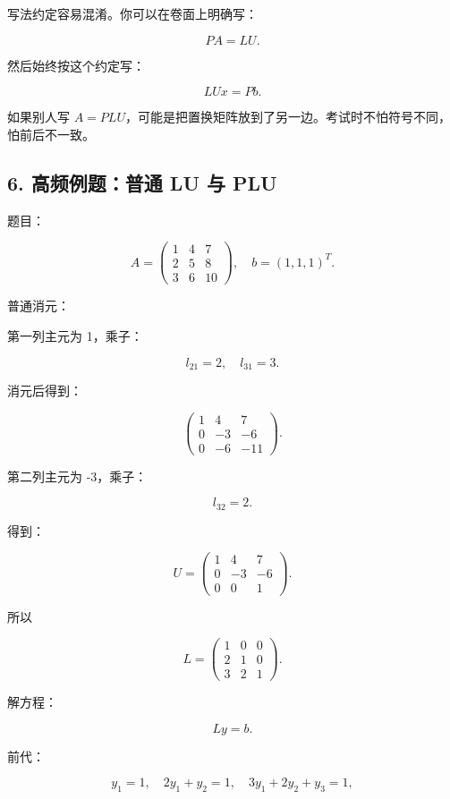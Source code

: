 \documentclass[11pt,a4paper]{ctexart}
\begin{document}
写法约定容易混淆。你可以在卷面上明确写：

\[
PA=LU.
\]

然后始终按这个约定写：

\[
LUx=Pb.
\]

如果别人写 $A=PLU$，可能是把置换矩阵放到了另一边。考试时不怕符号不同，怕前后不一致。


\subsection*{6. 高频例题：普通 LU 与 PLU}


题目：

\[
A=\begin{pmatrix}1&4&7\\2&5&8\\3&6&10\end{pmatrix},\quad b=(1,1,1)^T.
\]

普通消元：

第一列主元为 1，乘子：

\[
l_{21}=2,\quad l_{31}=3.
\]

消元后得到：

\[
\begin{pmatrix}
1&4&7\\
0&-3&-6\\
0&-6&-11
\end{pmatrix}.
\]

第二列主元为 -3，乘子：

\[
l_{32}=2.
\]

得到：

\[
U=\begin{pmatrix}
1&4&7\\
0&-3&-6\\
0&0&1
\end{pmatrix}.
\]

所以

\[
L=\begin{pmatrix}
1&0&0\\
2&1&0\\
3&2&1
\end{pmatrix}.
\]

解方程：

\[
Ly=b.
\]

前代：

\[
y_1=1,\quad 2y_1+y_2=1,\quad 3y_1+2y_2+y_3=1,
\]
\end{document}
